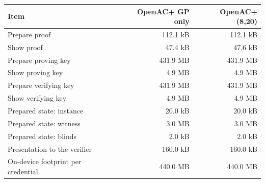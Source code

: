 \begin{tabular}{lrr}
\toprule
Item & OpenAC+ GP only & OpenAC+ (8,20) \\
\midrule
Prepare proof & 112.1 kB & 112.1 kB \\
Show proof & 47.4 kB & 47.6 kB \\
Prepare proving key & 431.9 MB & 431.9 MB \\
Show proving key & 4.9 MB & 4.9 MB \\
Prepare verifying key & 431.9 MB & 431.9 MB \\
Show verifying key & 4.9 MB & 4.9 MB \\
Prepared state: instance & 20.0 kB & 20.0 kB \\
Prepared state: witness & 3.0 MB & 3.0 MB \\
Prepared state: blinds & 2.0 kB & 2.0 kB \\
Presentation to the verifier & 160.0 kB & 160.0 kB \\
On-device footprint per credential & 440.0 MB & 440.0 MB \\
\bottomrule
\end{tabular}
